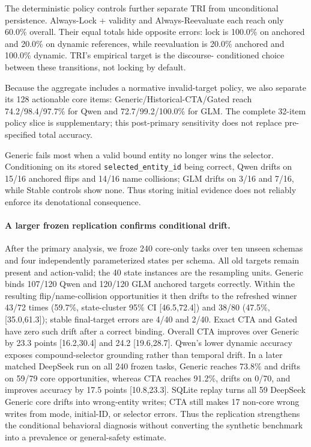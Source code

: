 \documentclass[letterpaper]{article}
\begin{document}
The deterministic policy controls further separate TRI from unconditional persistence.
Always-Lock + validity and Always-Reevaluate each reach only 60.0\% overall. Their equal totals
hide opposite errors: lock is 100.0\% on anchored and 20.0\% on dynamic references, while
reevaluation is 20.0\% anchored and 100.0\% dynamic. TRI's empirical target is the discourse-
conditioned choice between these transitions, not locking by default.

Because the aggregate includes a normative invalid-target policy, we also separate its 128
actionable core items: Generic/Historical-CTA/Gated reach 74.2/98.4/97.7\% for Qwen and
72.7/99.2/100.0\% for GLM. The complete 32-item policy slice is supplementary; this
post-primary sensitivity does not replace pre-specified total accuracy.

Generic fails most when a valid bound entity no longer wins the selector. Conditioning on its
stored \texttt{selected\_entity\_id} being correct, Qwen drifts on 15/16 anchored flips and 14/16
name collisions; GLM drifts on 3/16 and 7/16, while Stable controls show none. Thus storing initial
evidence does not reliably enforce its denotational consequence.

\paragraph{A larger frozen replication confirms conditional drift.}
After the primary analysis, we froze 240 core-only tasks over ten unseen schemas and four
independently parameterized states per schema. All old targets remain present and action-valid;
the 40 state instances are the resampling units. Generic binds 107/120 Qwen and 120/120 GLM
anchored targets correctly. Within the resulting flip/name-collision opportunities it then drifts
to the refreshed winner 43/72 times (59.7\%, state-cluster 95\% CI [46.5,72.4]) and 38/80
(47.5\%, [35.0,61.3]); stable final-target errors are 4/40 and 2/40. Exact CTA and Gated have
zero such drift after a correct binding. Overall CTA improves over Generic by 23.3 points
[16.2,30.4] and 24.2 [19.6,28.7]. Qwen's lower dynamic accuracy exposes compound-selector
grounding rather than temporal drift. In a later matched DeepSeek run on all 240 frozen tasks,
Generic reaches 73.8\% and drifts on 59/79 core opportunities, whereas CTA reaches 91.2\%,
drifts on 0/70, and improves accuracy by 17.5 points [10.8,23.3]. SQLite replay turns all 59
DeepSeek Generic core drifts into wrong-entity writes; CTA still makes 17 non-core wrong writes
from mode, initial-ID, or selector errors. Thus the replication strengthens the conditional
behavioral diagnosis without converting the synthetic benchmark into a prevalence or general-safety estimate.
\end{document}
